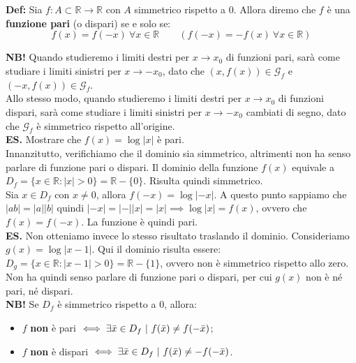 \documentclass{article}
\begin{document}
\noindent\textbf{Def:} Sia $f: A \subset \mathbb{R} \xrightarrow{} \mathbb{R}$ con $A$ simmetrico rispetto a $0$. Allora diremo che $f$ è una \textbf{funzione pari} (o dispari) se e solo se:
\begin{equation*}
    f(x) = f(-x) \ \forall x \in \mathbb{R} \qquad (f(-x) = - f(x) \ \forall x \in \mathbb{R})
\end{equation*}

\noindent\textbf{NB!} Quando studieremo i limiti destri per $x \to x_0$ di funzioni pari, sarà come studiare i limiti sinistri per $x \to -x_0$, dato che $(x, f(x)) \in \mathcal{G}_f$ e $(-x, f(x)) \in \mathcal{G}_f$.\\
Allo stesso modo, quando studieremo i limiti destri per $x \to x_0$ di funzioni dispari, sarà come studiare i limiti sinistri per $x \to - x_0$ cambiati di segno, dato che $\mathcal{G}_f$ è simmetrico rispetto all'origine.\\

\noindent\textbf{ES.} Mostrare che $f(x) = \log|x|$ è pari. \\
Innanzitutto, verifichiamo che il dominio sia simmetrico, altrimenti non ha senso parlare di funzione pari o dispari. Il dominio della funzione $f(x)$ equivale a $D_f = \{x \in \mathbb{R} : |x| > 0\} = \mathbb{R} - \{0\}$. Risulta quindi simmetrico.\\
Sia $x \in D_f$ con $x \neq 0$, allora $f(-x) = \log|-x|$. A questo punto sappiamo che $|ab| = |a||b|$ quindi $|-x| = |-||x| = |x| \implies \log|x| = f(x)$, ovvero che $f(x) = f(-x)$. La funzione è quindi pari.\\

\noindent\textbf{ES.} Non otteniamo invece lo stesso risultato traslando il dominio. Consideriamo $g(x) = \log|x - 1|$. Qui il dominio risulta essere: $D_g = \{x \in \mathbb{R} : |x - 1| > 0\} = \mathbb{R} - \{1\}$, ovvero non è simmetrico rispetto allo zero. Non ha quindi senso parlare di funzione pari o dispari, per cui $g(x)$ non è né pari, né dispari.\\

\noindent\textbf{NB!} Se $D_f$ è simmetrico rispetto a $0$, allora:
\begin{itemize}
    \item $f$ \textbf{non} è pari $\iff \exists \Bar{x} \in D_f \ | \ f(\Bar{x}) \neq f(- \Bar{x})$;
    \item $f$ \textbf{non} è dispari $\iff \exists \Bar{x} \in D_f \ | \ f(\Bar{x}) \neq - f(- \Bar{x})$.
\end{itemize}
\end{document}
